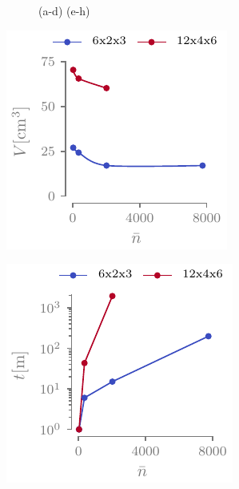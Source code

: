 \begin{figure}
    \hfill
    \hspace*{\fill}
    \caption{(a-d) (e-h)}
    \label{fig:05_comp_results}
\end{figure}

\begin{marginfigure}
    \centering
    \includegraphics{figures/05_cellular_opt/00_module_complexity_tab/comp_tab_v.pdf}
    \caption{}
    \label{fig:05_comp_v}
\end{marginfigure}

\begin{marginfigure}
    \centering
    \includegraphics{figures/05_cellular_opt/00_module_complexity_tab/comp_tab_t.pdf}
    \caption{}
    \label{fig:05_comp_t}
\end{marginfigure}

